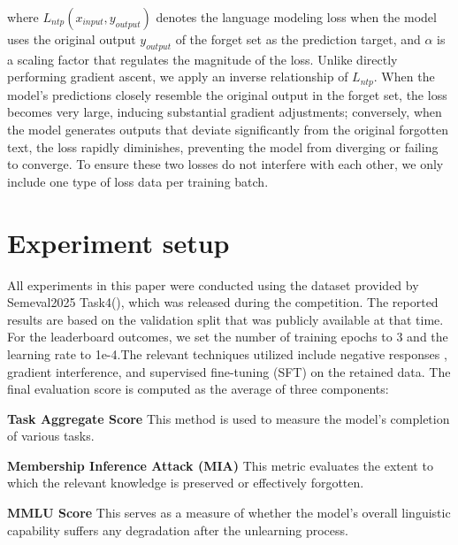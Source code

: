 \documentclass[11pt]{article}
\begin{document}
where $L_{ntp}(x_{input},y_{output})$ denotes the language modeling loss when the model uses the original output $y_{output}$ of the forget set as the prediction target, and $\alpha$ is a scaling factor that regulates the magnitude of the loss. Unlike directly performing gradient ascent, we apply an inverse relationship of $L_{ntp}$. When the model’s predictions closely resemble the original output in the forget set, the loss becomes very large, inducing substantial gradient adjustments; conversely, when the model generates outputs that deviate significantly from the original forgotten text, the loss rapidly diminishes, preventing the model from diverging or failing to converge. To ensure these two losses do not interfere with each other, we only include one type of loss data per training batch.

\section{Experiment setup}
All experiments in this paper were conducted using the dataset provided by Semeval2025 Task4(\citep{ramakrishna2025lumellmunlearningmultitask}), which was released during the competition. The reported results are based on the validation split that was publicly available at that time. For the leaderboard outcomes, we set the number of training epochs to 3 and the learning rate to 
1e-4.The relevant techniques utilized include negative responses \citep{choi2024snap, shi2024ulmr}, gradient interference, and supervised fine-tuning (SFT) on the retained data.
The final evaluation score is computed as the average of three components:

\noindent\textbf{Task Aggregate Score} This method is used to measure the model's completion of various tasks.

\noindent\textbf{Membership Inference Attack (MIA)} This metric evaluates the extent to which the relevant knowledge is preserved or effectively forgotten.

\noindent\textbf{MMLU Score} This serves as a measure of whether the model’s overall linguistic capability suffers any degradation after the unlearning process.
\end{document}
